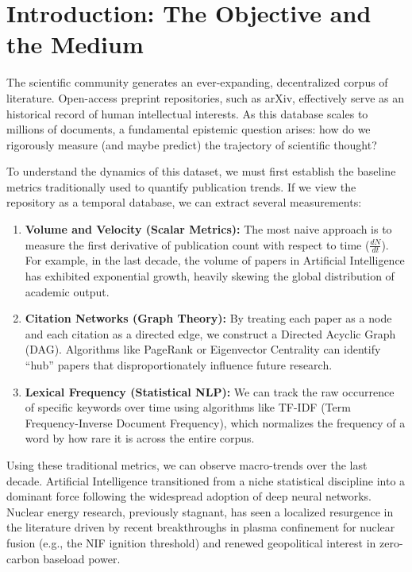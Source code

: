 
\chapter{Introduction: The Objective and the Medium}

The scientific community generates an ever-expanding, decentralized corpus of literature. Open-access preprint repositories, such as arXiv, effectively serve as an historical record of human intellectual interests. As this database scales to millions of documents, a fundamental epistemic question arises: how do we rigorously measure (and maybe predict) the trajectory of scientific thought? \cite{Fortunato2018}

To understand the dynamics of this dataset, we must first establish the baseline metrics traditionally used to quantify publication trends. If we view the repository as a temporal database, we can extract several measurements:

\begin{enumerate}
    \item \textbf{Volume and Velocity (Scalar Metrics):} The most naive approach is to measure the first derivative of publication count with respect to time ($\frac{dN}{dt}$). For example, in the last decade, the volume of papers in Artificial Intelligence has exhibited exponential growth, heavily skewing the global distribution of academic output.
    \item \textbf{Citation Networks (Graph Theory):} By treating each paper as a node and each citation as a directed edge, we construct a Directed Acyclic Graph (DAG). Algorithms like PageRank or Eigenvector Centrality can identify ``hub'' papers that disproportionately influence future research.
    \item \textbf{Lexical Frequency (Statistical NLP):} We can track the raw occurrence of specific keywords over time using algorithms like TF-IDF (Term Frequency-Inverse Document Frequency), which normalizes the frequency of a word by how rare it is across the entire corpus.
\end{enumerate}

Using these traditional metrics, we can observe macro-trends over the last decade. Artificial Intelligence transitioned from a niche statistical discipline into a dominant force following the widespread adoption of deep neural networks. Nuclear energy research, previously stagnant, has seen a localized resurgence in the literature driven by recent breakthroughs in plasma confinement for nuclear fusion (e.g., the NIF ignition threshold) and renewed geopolitical interest in zero-carbon baseload power.

